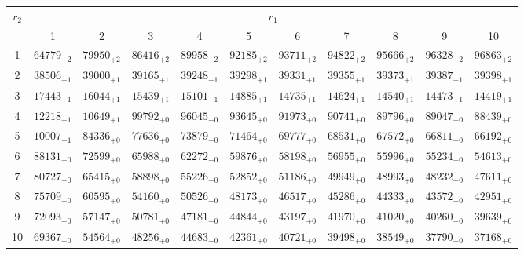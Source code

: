 \documentclass[10pt, a4paper]{article}
\begin{document}
\begin{center}
    \begin{tabular}{c || c c c c c | c c c c c}
        \multirow{2}{*}{\(r_2\)} & \multicolumn{10}{c}{\(r_1\)} \\
        & 1 & 2 & 3 & 4 & 5 & 6 & 7 & 8 & 9 & 10\\
        \hline\hline
        1 & \({64779}_{+2}\) & \({79950}_{+2}\) & \({86416}_{+2}\) & \({89958}_{+2}\) & \({92185}_{+2}\) & \({93711}_{+2}\) & \({94822}_{+2}\) & \({95666}_{+2}\) & \({96328}_{+2}\) & \({96863}_{+2}\)\\
        2 & \({38506}_{+1}\) & \({39000}_{+1}\) & \({39165}_{+1}\) & \({39248}_{+1}\) & \({39298}_{+1}\) & \({39331}_{+1}\) & \({39355}_{+1}\) & \({39373}_{+1}\) & \({39387}_{+1}\) & \({39398}_{+1}\)\\
        3 & \({17443}_{+1}\) & \({16044}_{+1}\) & \({15439}_{+1}\) & \({15101}_{+1}\) & \({14885}_{+1}\) & \({14735}_{+1}\) & \({14624}_{+1}\) & \({14540}_{+1}\) & \({14473}_{+1}\) & \({14419}_{+1}\)\\
        4 & \({12218}_{+1}\) & \({10649}_{+1}\) & \({99792}_{+0}\) & \({96045}_{+0}\) & \({93645}_{+0}\) & \({91973}_{+0}\) & \({90741}_{+0}\) & \({89796}_{+0}\) & \({89047}_{+0}\) & \({88439}_{+0}\)\\
        5 & \({10007}_{+1}\) & \({84336}_{+0}\) & \({77636}_{+0}\) & \({73879}_{+0}\) & \({71464}_{+0}\) & \({69777}_{+0}\) & \({68531}_{+0}\) & \({67572}_{+0}\) & \({66811}_{+0}\) & \({66192}_{+0}\)\\
        \hline
        6 & \({88131}_{+0}\) & \({72599}_{+0}\) & \({65988}_{+0}\) & \({62272}_{+0}\) & \({59876}_{+0}\) & \({58198}_{+0}\) & \({56955}_{+0}\) & \({55996}_{+0}\) & \({55234}_{+0}\) & \({54613}_{+0}\)\\
        7 & \({80727}_{+0}\) & \({65415}_{+0}\) & \({58898}_{+0}\) & \({55226}_{+0}\) & \({52852}_{+0}\) & \({51186}_{+0}\) & \({49949}_{+0}\) & \({48993}_{+0}\) & \({48232}_{+0}\) & \({47611}_{+0}\)\\
        8 & \({75709}_{+0}\) & \({60595}_{+0}\) & \({54160}_{+0}\) & \({50526}_{+0}\) & \({48173}_{+0}\) & \({46517}_{+0}\) & \({45286}_{+0}\) & \({44333}_{+0}\) & \({43572}_{+0}\) & \({42951}_{+0}\)\\
        9 & \({72093}_{+0}\) & \({57147}_{+0}\) & \({50781}_{+0}\) & \({47181}_{+0}\) & \({44844}_{+0}\) & \({43197}_{+0}\) & \({41970}_{+0}\) & \({41020}_{+0}\) & \({40260}_{+0}\) & \({39639}_{+0}\)\\
        10 & \({69367}_{+0}\) & \({54564}_{+0}\) & \({48256}_{+0}\) & \({44683}_{+0}\) & \({42361}_{+0}\) & \({40721}_{+0}\) & \({39498}_{+0}\) & \({38549}_{+0}\) & \({37790}_{+0}\) & \({37168}_{+0}\)\\

\end{tabular}
\end{center}
\end{document}
